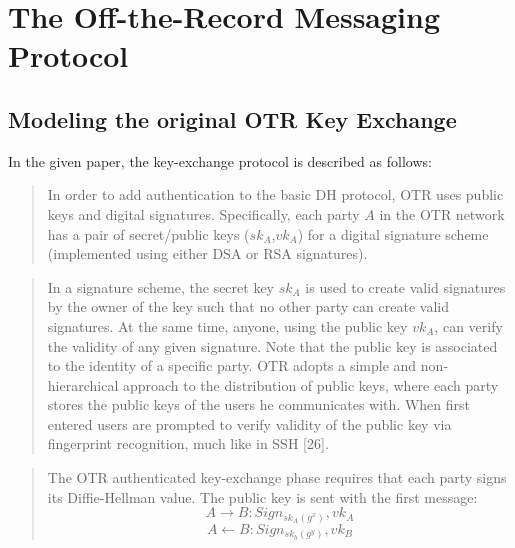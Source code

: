 \documentclass[a4paper,11pt]{scrartcl}
\begin{document}
\section{The Off-the-Record Messaging Protocol}
\subsection{Modeling the original OTR Key Exchange}
In the given paper, the key-exchange protocol is described as follows:
\begin{quote}
In order to add authentication to the basic DH protocol, OTR uses public keys and digital signatures. Specifically, each party $A$  in the OTR network has a pair of secret/public keys ($sk_A$,$vk_A$) for a digital signature scheme (implemented using either DSA or RSA signatures).
\end{quote}

\begin{quote}
In a signature scheme, the secret key $sk_A$ is used to create valid signatures by the owner of the key such that no other party can create valid signatures. At the same time, anyone, using the public key $vk_A$, can verify the validity of any given signature. Note that the public key is associated to the identity of a specific party. OTR adopts a simple and non-hierarchical approach to the distribution of public keys, where each party stores the public keys of the users he communicates with. When first entered users are prompted to verify validity of the public key via fingerprint recognition, much like in SSH {[}26{]}.
\end{quote}

\begin{quote}
The OTR authenticated key-exchange phase requires that each party signs its Diffie-Hellman value. The public key is sent with the first message:
\begin{displaymath}
A \rightarrow B : Sign_{sk_A(g^x)}, vk_A
\end{displaymath}
\begin{displaymath}
A \leftarrow B : Sign_{sk_b(g^y)}, vk_B
\end{displaymath}
\end{quote}
\end{document}
